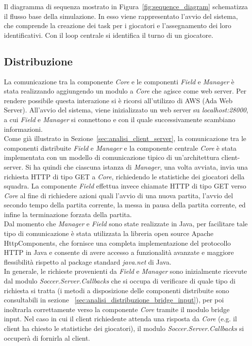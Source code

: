 Il diagramma di sequenza mostrato in Figura~\ref{fig:sequence_diagram} schematizza il flusso base della simulazione. In esso viene rappresentato l'avvio del sistema, che comprende la creazione dei task per i giocatori e l'assegnamento dei loro identificativi. Con il loop centrale si identifica il turno di un giocatore.

\subsection{Distribuzione}
\label{sec:implementazione_distribuzione}

La comunicazione tra la componente \emph{Core} e le componenti \emph{Field} e \emph{Manager} è stata realizzando aggiungendo un modulo a \emph{Core} che agisce come web server. Per rendere possibile questa interazione si è ricorsi all'utilizzo di AWS (Ada Web Server). All'avvio del sistema, viene inizializzato un web server su \emph{localhost:28000}, a cui \emph{Field} e \emph{Manager} si connettono e con il quale successivamente scambiano informazioni.\\

Come già illustrato in Sezione~\ref{sec:analisi_client_server}, la comunicazione tra le componenti distribuite \emph{Field} e \emph{Manager} e la componente centrale \emph{Core} è stata implementata con un modello di comunicazione tipico di un’architettura client-server. Si ha quindi che ciascuna istanza di \emph{Manager}, una volta avviata, invia una richiesta HTTP di tipo GET a \emph{Core}, richiedendo le statistiche dei giocatori della squadra. La componente \emph{Field} effettua invece chiamate HTTP di tipo GET verso \emph{Core} al fine di richiedere azioni quali l'avvio di una nuova partita, l'avvio del secondo tempo della partita corrente, la messa in pausa della partita corrente, ed infine la terminazione forzata della partita.\\

Dal momento che \textit{Manager} e \textit{Field} sono state realizzate in Java, per facilitare tale tipo di comunicazione è stata utilizzata la libreria open source Apache HttpComponents, che fornisce una completa implementazione del protocollo HTTP in Java e consente di avere accesso a funzionalità avanzate e maggiore flessibilità rispetto al package standard \emph{java.net} di Java.\\

In generale, le richieste provenienti da \emph{Field} e \emph{Manager} sono inizialmente ricevute dal modulo \emph{Soccer.Server.Callbacks} che si occupa di verificare di quale tipo di richiesta si tratta (i metodi a disposizione delle componenti distribuite sono consultabili in sezione ~\ref{sec:analisi_distribuzione_bridge_input}), per poi inoltrarla correttamente verso la componente \emph{Core} tramite il modulo bridge input. Nel caso in cui il client richiedente attenda una risposta da \emph{Core} (e.g. il client ha chiesto le statistiche dei giocatori), il modulo \emph{Soccer.Server.Callbacks} si occuper\`{a} di fornirla al client.\\

